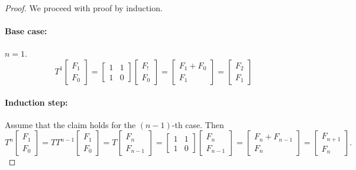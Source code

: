 \documentclass{article}
\begin{document}
\vspace{5mm}
\begin{proof}
  We proceed with proof by induction.
  \paragraph{Base case:} $n = 1$.
  \begin{equation*}
    T^1
    \begin{bmatrix}
      F_1 \\
      F_0
    \end{bmatrix}
    =
    \begin{bmatrix}
      1 & 1 \\
      1 & 0
    \end{bmatrix}
    \begin{bmatrix}
      F_! \\
      F_0
    \end{bmatrix}
    =
    \begin{bmatrix}
      F_1 + F_0 \\
      F_1
    \end{bmatrix}
    =
    \begin{bmatrix}
      F_2 \\
      F_1
    \end{bmatrix}
  \end{equation*}

  \paragraph{Induction step:} Assume that the claim holds for the $(n - 1)$-th
  case.  Then
  \begin{equation*}
    T^n
    \begin{bmatrix}
      F_1 \\
      F_0
    \end{bmatrix}
    =
    T T^{n - 1}
    \begin{bmatrix}
      F_1 \\
      F_0
    \end{bmatrix}
    =
    T
    \begin{bmatrix}
      F_{n} \\
      F_{n - 1}
    \end{bmatrix}
    =
    \begin{bmatrix}
      1 & 1 \\
      1 & 0
    \end{bmatrix}
    \begin{bmatrix}
      F_{n} \\
      F_{n - 1}
    \end{bmatrix}
    =
    \begin{bmatrix}
      F_{n} + F_{n - 1} \\
      F_n
    \end{bmatrix}
    =
    \begin{bmatrix}
      F_{n + 1} \\
      F_n
    \end{bmatrix}.
  \end{equation*}

\end{proof}
\end{document}
